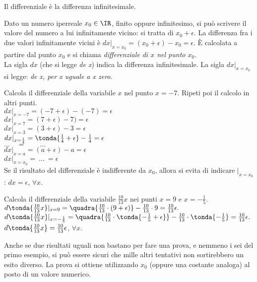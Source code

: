 \begin{definizione}
 Il differenziale è la differenza infinitesimale.
\end{definizione}

Dato un numero iperreale $x_0\in\IR$, finito oppure infinitesimo, si può scrivere il 
valore del numero a lui infinitamente vicino: si tratta di $x_0+\epsilon$. La differenza 
fra i due valori infinitamente vicini è $dx|_{x=x_0}=(x_0+\epsilon)-x_0=\epsilon$.
È calcolata a partire dal punto $x_0$ e si chiama \emph{differenziale di $x$ nel 
punto $x_0$}.\\
La sigla $dx$ (che si legge \emph{de x}) indica la differenza infinitesimale.
La sigla $dx|_{x=x_0}$ si legge: \emph{de x, per x uguale a x zero}. 

\begin{esempio}
 Calcola il differenziale della variabile $x$ nel punto $x=-7$. Ripeti poi il 
 calcolo in altri punti.\\
  $dx|_{x=-7} =(-7+\epsilon)-(-7)=\epsilon$\\
  $dx|_{x=7} =(7+\epsilon)-7)=\epsilon$\\
  $dx|_{x=3} =(3+\epsilon)-3=\epsilon$\\
  $dx|_{x=\frac{1}{4}} = \tonda{\frac{1}{4}+\epsilon}-\frac{1}{4}=\epsilon$\\
  $...\quad = \qquad ...$\\
  $dx|_{x=a}  =(a+\epsilon)-a=\epsilon$\\
  $dx|_{x=x_0}  =\ ...\ =\epsilon$\\
  Se il risultato del differenziale è indifferente da $x_0$, allora si evita di 
  indicare $|_{x=x_0}$: $dx=\epsilon$, $\forall x$. 
\end{esempio}

\begin{esempio}
 Calcola il differenziale della variabile $\frac{10}{13}x$ nei punti $x=9$ e 
 $x=-\frac{1}{5}$.\\
 $d\tonda{\frac{10}{13}x}|_{x=9}=\quadra{\frac{10}{13}\cdot(9+\epsilon)}-\frac{10}{13}\cdot 9=
 \frac{10}{13}\epsilon.$\\
 $d\tonda{\frac{10}{13}x}|_{x=-\frac{1}{5}}=\quadra{\frac{10}{13}\cdot\tonda{-\frac{1}{5}+\epsilon}}-
 \frac{10}{13}\cdot \tonda{-\frac{1}{5}}= \frac{10}{13}\epsilon.$\\
 $d\tonda{\frac{10}{13}x}=\frac{10}{13}\epsilon$, $\forall x$.
 \end{esempio}

Anche se due risultati uguali non bastano per fare una prova, e nemmeno i sei 
del primo esempio, si può essere sicuri che mille altri tentativi non
sortirebbero un esito diverso. La prova si ottiene utilizzando $x_0$ 
(oppure una costante analoga) al posto di un valore numerico.

